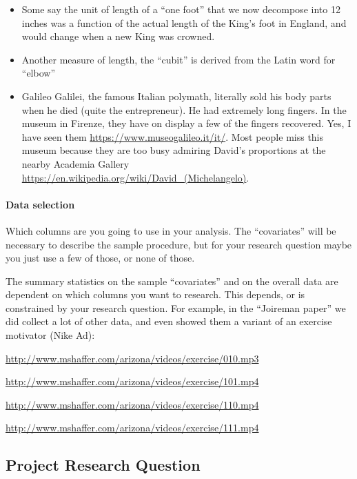 \documentclass[]{article}
\begin{document}
\begin{itemize}
\item
  Some say the unit of length of a ``one foot'' that we now decompose
  into 12 inches was a function of the actual length of the King's foot
  in England, and would change when a new King was crowned.
\item
  Another measure of length, the ``cubit'' is derived from the Latin
  word for ``elbow''
\item
  Galileo Galilei, the famous Italian polymath, literally sold his body
  parts when he died (quite the entrepreneur). He had extremely long
  fingers. In the museum in Firenze, they have on display a few of the
  fingers recovered. Yes, I have seen them
  \url{https://www.museogalileo.it/it/}. Most people miss this museum
  because they are too busy admiring David's proportions at the nearby
  Academia Gallery
  \url{https://en.wikipedia.org/wiki/David_(Michelangelo)}.
\end{itemize}

\hypertarget{data-selection}{%
\paragraph{Data selection}\label{data-selection}}

Which columns are you going to use in your analysis. The ``covariates''
will be necessary to describe the sample procedure, but for your
research question maybe you just use a few of those, or none of those.

The summary statistics on the sample ``covariates'' and on the overall
data are dependent on which columns you want to research. This depends,
or is constrained by your research question. For example, in the
``Joireman paper'' we did collect a lot of other data, and even showed
them a variant of an exercise motivator (Nike Ad):

\url{http://www.mshaffer.com/arizona/videos/exercise/010.mp3}

\url{http://www.mshaffer.com/arizona/videos/exercise/101.mp4}

\url{http://www.mshaffer.com/arizona/videos/exercise/110.mp4}

\url{http://www.mshaffer.com/arizona/videos/exercise/111.mp4}

\hypertarget{project-research-question}{%
\subsection{Project Research Question}\label{project-research-question}}
\end{document}
